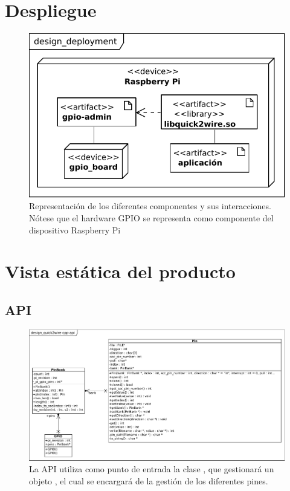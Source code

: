 \documentclass[letterpaper,10pt,spanish]{sphinxmanual}
\begin{document}
\section{Despliegue}
\label{design/deployment::doc}\label{design/deployment:despliegue}\begin{figure}[htbp]
\centering
\capstart

\includegraphics{design_deployment.pdf}
\caption{Representación de los diferentes componentes y sus interacciones. Nótese que el hardware GPIO se representa como componente del dispositivo Raspberry Pi}\end{figure}


\section{Vista estática del producto}
\label{design/static::doc}\label{design/static:vista-estatica-del-producto}

\subsection{API}
\label{design/static:api}\begin{figure}[htbp]
\centering
\capstart

\includegraphics{design_quick2wire-cpp-api.pdf}
\caption{La API utiliza como punto de entrada la clase , que gestionará un objeto , el cual se encargará de la gestión de los diferentes pines.}\end{figure}
\end{document}
